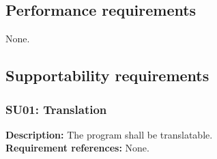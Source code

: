 \subsection{Performance requirements}
\begin{adjustwidth}{2em}{0pt}

    None.

\end{adjustwidth}

\subsection{Supportability requirements}
\begin{adjustwidth}{2em}{0pt}

    \subsubsection*{SU01: Translation}
    \begin{adjustwidth}{1em}{0pt}
        \textbf{Description:}
        The program shall be translatable.\\
        \textbf{Requirement references:}
        None.
    \end{adjustwidth}

\end{adjustwidth}
